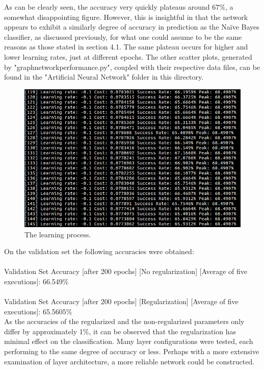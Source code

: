 \documentclass[a4paper]{article}
\begin{document}
As can be clearly seen, the accuracy very quickly plateaus around 67\%, a somewhat disappointing figure. However, this is insightful in that the network appears to exhibit a similarly degree of accuracy in prediction as the Naïve Bayes classifier, as discussed previously, for what one could assume to be the same reasons as those stated in section 4.1. The same plateau occurs for higher and lower learning rates, just at different epochs. The other scatter plots, generated by "graph\textunderscore network\textunderscore performance.py", coupled with their respective data files, can be found in the "Artificial Neural Network" folder in this directory.

\begin{figure}[h]
\includegraphics[scale=0.3]{learning.png}
\caption{The learning process.}
\end{figure}
\pagebreak
On the validation set the following accuracies were obtained:
\\\\
Validation Set Accuracy [after 200 epochs] [No regularization] [Average of five executions]: 66.549\%\\\\
Validation Set Accuracy [after 200 epochs] [Regularization] [Average of five executions]: 65.5605\%\\

As the accuracies of the regularized and the non-regularized parameters only differ by approximately 1\%, it can be observed that the regularization has minimal effect on the classification. Many layer configurations were tested, each performing to the same degree of accuracy or less. Perhaps with a more extensive examination of layer architecture, a more reliable network could be constructed.
\end{document}
